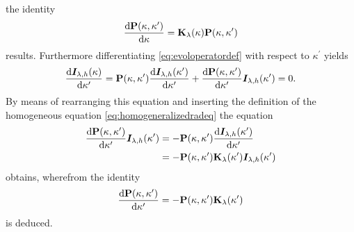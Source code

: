 \documentclass[a4paper,12pt]{report}
\begin{document}
\begin{align}
\begin{aligned}
\end{aligned}
\end{align} the identity \begin{equation}\label{eq:grte_op_id_1}
\frac{\mathrm{d}\boldsymbol{\mathbf{P}}(\kappa,\kappa^\prime)}{\mathrm{d}\kappa} = \boldsymbol{\mathbf{K}}_\lambda(\kappa)\boldsymbol{\mathbf{P}}(\kappa,\kappa^\prime)
\end{equation} results. Furthermore differentiating \cref{eq:evoloperatordef} with respect to $\kappa^\prime$ yields \begin{align}
\begin{aligned}
\frac{\mathrm{d}\bm{I}_{\lambda,h}(\kappa)}{\mathrm{d}\kappa^\prime} = \boldsymbol{\mathbf{P}}(\kappa,\kappa^\prime)\frac{\mathrm{d}\bm{I}_{\lambda,h}(\kappa^\prime)}{\mathrm{d}\kappa^\prime} + \frac{\mathrm{d}\boldsymbol{\mathbf{P}}(\kappa,\kappa^\prime)}{\mathrm{d}\kappa^\prime}\bm{I}_{\lambda,h}(\kappa^\prime) = 0.
\end{aligned}
\end{align} By means of rearranging this equation and inserting the definition of the homogeneous equation \eqref{eq:homogeneralizedradeq} the equation \begin{align}
\begin{aligned}
\frac{\mathrm{d}\boldsymbol{\mathbf{P}}(\kappa,\kappa^\prime)}{\mathrm{d}\kappa^\prime}\bm{I}_{\lambda,h}(\kappa^\prime) &= -\boldsymbol{\mathbf{P}}(\kappa,\kappa^\prime)\frac{\mathrm{d}\bm{I}_{\lambda,h}(\kappa^\prime)}{\mathrm{d}\kappa^\prime} \\ &= -\boldsymbol{\mathbf{P}}(\kappa,\kappa^\prime)\boldsymbol{\mathbf{K}}_\lambda(\kappa^\prime)\bm{I}_{\lambda,h}(\kappa^\prime)
\end{aligned}
\end{align} obtains, wherefrom the identity \begin{equation}\label{eq:grte_op_id_2}
\frac{\mathrm{d}\boldsymbol{\mathbf{P}}(\kappa,\kappa^\prime)}{\mathrm{d}\kappa^\prime} = -\boldsymbol{\mathbf{P}}(\kappa,\kappa^\prime)\boldsymbol{\mathbf{K}}_\lambda(\kappa^\prime)
\end{equation} is deduced.
\end{document}
